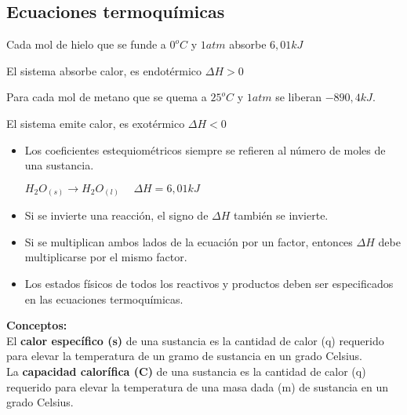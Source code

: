     \subsection{Ecuaciones termoquímicas}
        \sangria{} Cada mol de hielo que se funde a $0^oC$ y $1atm$ absorbe $6,01kJ$
        \begin{center} El sistema absorbe calor, es endotérmico $\Delta H > 0$ \end{center}
        \sangria{} Para cada mol de metano que se quema a $25^oC$ y $1atm$ se liberan $-890,4 kJ$.
        \begin{center} El sistema emite calor, es exotérmico $\Delta H < 0$ \end{center}
        \begin{itemize}
            \item Los coeficientes estequiométricos siempre se refieren al número de moles de una sustancia.
                \begin{center} $H_2O_{(s)} \rightarrow H_2O_{(l)} \hspace{15pt} \Delta H = 6,01 kJ$ \end{center}
            \item Si se invierte una reacción, el signo de $\Delta H$ también se invierte.
            \item Si se multiplican ambos lados de la ecuación por un factor, entonces $\Delta H$ debe multiplicarse por el mismo factor.
        \end{itemize}
        \begin{itemize}
            \item Los estados físicos de todos los reactivos y productos deben ser especificados en las ecuaciones termoquímicas.
        \end{itemize}
        \textbf{Conceptos:} \\
        \sangria{} El \textbf{calor específico (s)} de una sustancia es la cantidad de calor (q) requerido para elevar la temperatura de un gramo de sustancia en un grado Celsius. \\
        \sangria{} La \textbf{capacidad calorífica (C)} de una sustancia es la cantidad de calor (q) requerido para elevar la temperatura de una masa dada (m) de sustancia en un grado Celsius.
